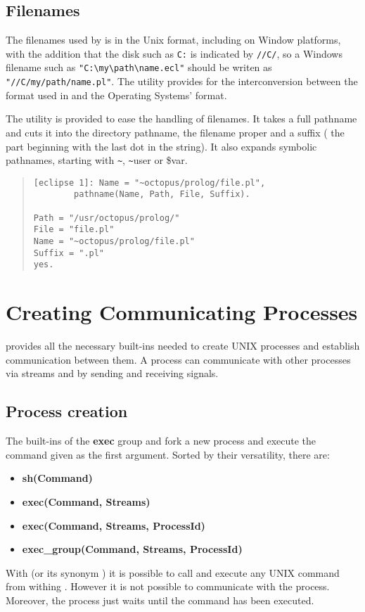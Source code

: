 \subsection{Filenames}
The filenames used by {\eclipse} is in the Unix format, including on Window
platforms, with the addition that the disk such as \verb+C:+ is
indicated by \verb+//C/+, so a Windows filename such as
\verb+"C:\my\path\name.ecl"+ should be writen as
\verb+"//C/my/path/name.pl"+. The utility  provides for
the interconversion between the format used in {\eclipse} and the Operating
Systems' format.  

The utility 
is provided to ease the handling of filenames.
It takes a full pathname and cuts it into the directory
pathname, the filename proper and a suffix (
the part beginning with the last dot in the string).
It also expands symbolic pathnames, starting with \verb$~$, \verb$~$user
or \$var.
\begin{quote}\begin{verbatim}
[eclipse 1]: Name = "~octopus/prolog/file.pl",
        pathname(Name, Path, File, Suffix).

Path = "/usr/octopus/prolog/"
File = "file.pl"
Name = "~octopus/prolog/file.pl"
Suffix = ".pl"
yes.
\end{verbatim}\end{quote}


\section{Creating Communicating Processes}
{\eclipse} provides all the necessary built-ins needed to create UNIX processes
and establish communication between them.
A {\eclipse} process can communicate with other processes via streams and by
sending and receiving signals.

\subsection{Process creation}
The built-ins of the {\bf exec} group and 
fork a new process and execute the command given as the first argument.
Sorted by their versatility, there are:
\begin{itemize}
\item {\bf sh(Command)}
\item {\bf exec(Command, Streams)}
\item {\bf exec(Command, Streams, ProcessId)}
\item {\bf exec_group(Command, Streams, ProcessId)}
\end{itemize}
With  (or its synonym ) it is possible to
call and execute any UNIX command from withing {\eclipse}.
However it is not possible to communicate with the process.
Moreover, the {\eclipse} process just waits until the command has been executed.

